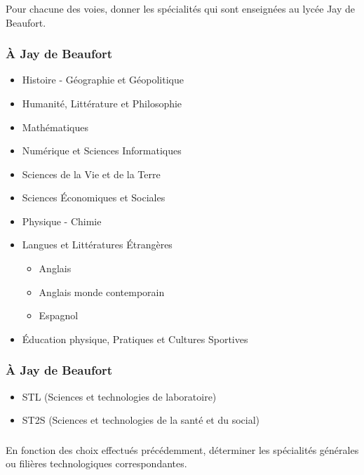 \documentclass[svgnames,11pt]{beamer}
\begin{document}
\begin{frame}
    \frametitle{}

    \begin{activite}
    Pour chacune des voies, donner les spécialités qui sont enseignées au lycée Jay de Beaufort.
    \end{activite}

\end{frame}
\begin{frame}
    \frametitle{À Jay de Beaufort}

    \begin{itemize}
        \item Histoire - Géographie et Géopolitique
        \item Humanité, Littérature et Philosophie
        \item Mathématiques
        \item Numérique et Sciences Informatiques
        \item Sciences de la Vie et de la Terre
        \item Sciences Économiques et Sociales
        \item Physique - Chimie
        \item Langues et Littératures Étrangères
        \begin{itemize}
            \item Anglais
            \item Anglais monde contemporain
            \item Espagnol
        \end{itemize}
        \item Éducation physique, Pratiques et Cultures Sportives
    \end{itemize}

\end{frame}
\begin{frame}
    \frametitle{À Jay de Beaufort}

    \begin{itemize}
        \item STL (Sciences et technologies de laboratoire)
        \item ST2S (Sciences et technologies de la santé et du social)    
    \end{itemize}

\end{frame}
\begin{frame}
    \frametitle{}

    \begin{activite}
    En fonction des choix effectués précédemment, déterminer les spécialités générales ou filières technologiques correspondantes.
    \end{activite}

\end{frame}
\end{document}
